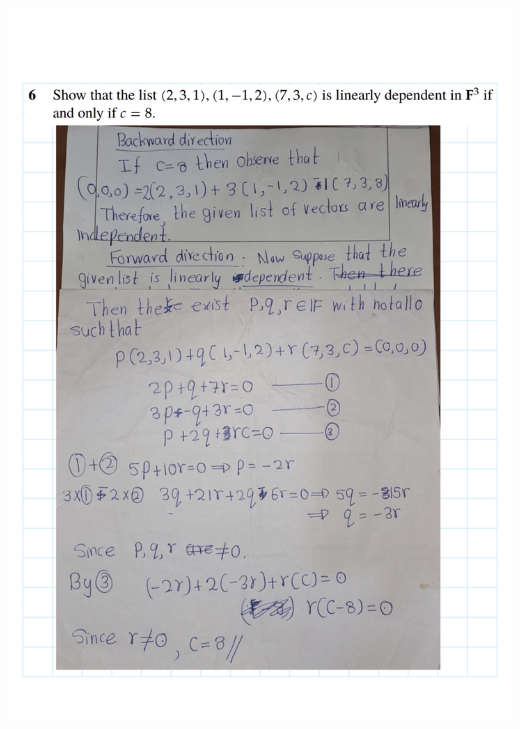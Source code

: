 \documentclass[
]{book}
\theoremstyle{definition}
\theoremstyle{definition}
\theoremstyle{definition}
\theoremstyle{definition}
\theoremstyle{remark}
\begin{document}
\includegraphics{fig/Ex2A/Ex2A-08.png}
\end{document}
